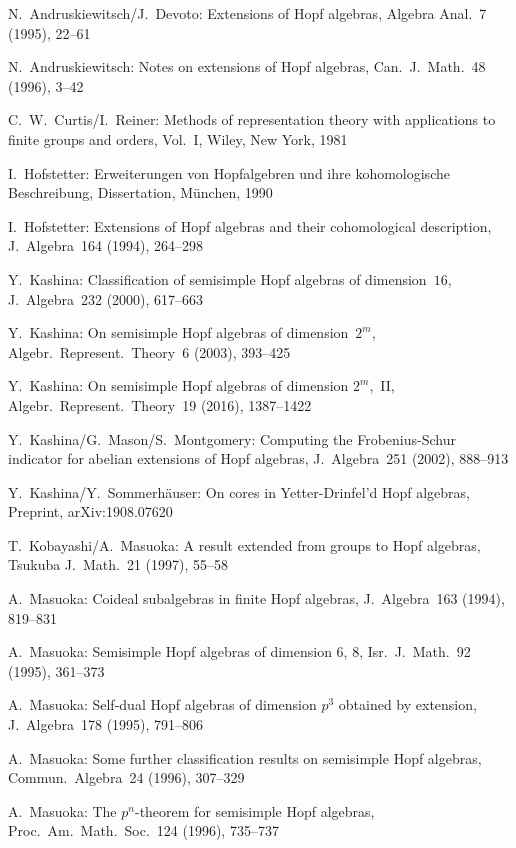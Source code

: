 \documentclass{article}
\numberwithin{equation}{section}
\theoremstyle{definition}
\theoremstyle{break}
\newcommand{\1}{{(1)}}
\newcommand{\2}{{(2)}}
\newcommand{\3}{{(3)}}
\begin{document}
\begin{thebibliography}{99}
 N.~Andruskiewitsch/J.~Devoto: Extensions of Hopf algebras, Algebra Anal.~7 (1995), 22--61

 N.~Andruskiewitsch: Notes on extensions of Hopf algebras, Can.~J.~Math.~48 (1996), 3--42

 C.~W.~Curtis/I.~Reiner: Methods of representation theory with applications to finite groups and orders, Vol.~I, Wiley, New York, 1981

 I.~Hofstetter: Erweiterungen von Hopfalgebren und ihre kohomologische Beschreibung, Dissertation, M\"unchen, 1990

 I.~Hofstetter: Extensions of Hopf algebras and their cohomological description, J.~Algebra~164 (1994), 264--298

 Y.~Kashina: Classification of semisimple Hopf algebras of dimension~$16$, J.~Algebra~232 (2000), 617--663

 Y.~Kashina: On semisimple Hopf algebras of dimension~$2^{m}$, Algebr.~Represent.~Theory~6 (2003), 393--425

 Y.~Kashina: On semisimple Hopf algebras of dimension $2^{m}$,~II, Algebr.~Represent.~Theory~19 (2016), 1387--1422

 Y.~Kashina/G.~Mason/S.~Montgomery: Computing the Frobenius-Schur indicator for abelian extensions of Hopf algebras, J.~Algebra~251 (2002), 888--913

 Y.~Kashina/Y.~Sommerh\"auser: On cores in Yetter-Drinfel'd Hopf algebras, Preprint, arXiv:1908.07620

 T.~Kobayashi/A.~Masuoka: A result extended from groups to Hopf algebras, Tsukuba J.~Math.~21 (1997), 55--58

 A.~Masuoka: Coideal subalgebras in finite Hopf algebras, J.~Algebra~163 (1994), 819--831

 A.~Masuoka: Semisimple Hopf algebras of dimension $6$, $8$, Isr.~J.~Math.~92 (1995), 361--373

 A.~Masuoka: Self-dual Hopf algebras of dimension $p^{3}$ obtained by extension, J.~Algebra~178 (1995), 791--806

 A.~Masuoka: Some further classification results on semisimple Hopf algebras, Commun.~Algebra~24 (1996), 307--329

 A.~Masuoka: The $p^n$-theorem for semisimple Hopf algebras, Proc.\ Am.\ Math.\ Soc.\ 124 (1996), 735--737


\end{thebibliography}
\end{document}
